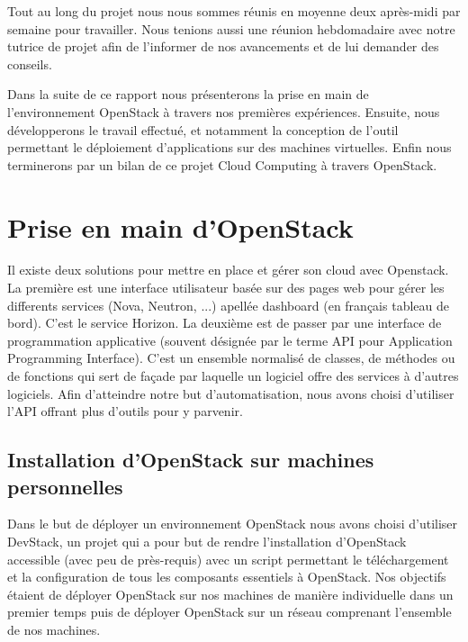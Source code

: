 \documentclass{report}
\begin{document}
        Tout au long du projet nous nous sommes réunis en moyenne deux après-midi par semaine pour travailler.
        Nous tenions aussi une réunion hebdomadaire avec notre tutrice de projet afin de l'informer de nos avancements et de lui demander des conseils.
        
        \bigbreak
    
        Dans la suite de ce rapport nous présenterons la prise en main de l'environnement OpenStack à travers nos premières expériences. Ensuite, nous développerons le travail effectué, et notamment la conception de l'outil permettant le déploiement d'applications sur des machines virtuelles. Enfin nous terminerons par un bilan de ce projet Cloud Computing à travers OpenStack.

    
\newpage
\chapter{Prise en main d'OpenStack}
       Il existe deux solutions pour mettre en place et gérer son cloud avec Openstack. La première est une interface utilisateur basée sur des pages web pour gérer les differents services (Nova, Neutron, ...) apellée dashboard (en français tableau de bord). C'est le service Horizon. La deuxième est de passer par une interface de programmation applicative (souvent désignée par le terme API pour Application Programming Interface). C'est un ensemble normalisé de classes, de méthodes ou de fonctions qui sert de façade par laquelle un logiciel offre des services à d'autres logiciels. Afin d'atteindre notre but d'automatisation, nous avons choisi d'utiliser l'API  offrant plus d'outils pour y parvenir.\bigbreak
       
       

    \section{Installation d'OpenStack sur machines personnelles}

    Dans le but de déployer un environnement OpenStack nous avons choisi d'utiliser DevStack, un projet qui a pour but de rendre l'installation d'OpenStack accessible (avec peu de près-requis) avec un script permettant le téléchargement et la configuration de tous les composants essentiels à OpenStack.\newline
    Nos objectifs étaient de déployer OpenStack sur nos machines de manière individuelle dans un premier temps puis de déployer OpenStack sur un réseau comprenant l'ensemble de nos machines.
    
\end{document}
